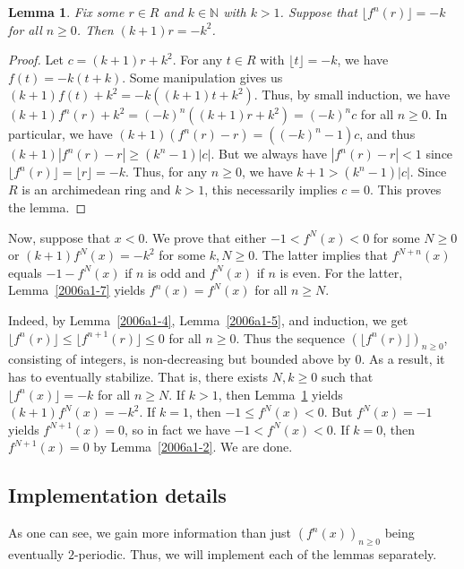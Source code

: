 \documentclass{article}
\newcommand{\N}{\mathbb{N}}
\newtheorem{lemma}{Lemma}
\begin{document}
\begin{lemma}\label{2006a1-8}
Fix some $r \in R$ and $k \in \N$ with $k > 1$.
Suppose that $\lfloor f^n(r) \rfloor = -k$ for all $n \geq 0$.
Then $(k + 1)r = -k^2$.
\end{lemma}
\begin{proof}
Let $c = (k + 1)r + k^2$.
For any $t \in R$ with $\lfloor t \rfloor = -k$, we have $f(t) = -k(t + k)$.
Some manipulation gives us $(k + 1)f(t) + k^2 = -k((k + 1)t + k^2)$.
Thus, by small induction, we have $(k + 1) f^n(r) + k^2 = (-k)^n ((k + 1) r + k^2) = (-k)^n c$ for all $n \geq 0$.
In particular, we have $(k + 1) (f^n(r) - r) = ((-k)^n - 1) c$, and thus $(k + 1) |f^n(r) - r| \geq (k^n - 1) |c|$.
But we always have $|f^n(r) - r| < 1$ since $\lfloor f^n(r) \rfloor = \lfloor r \rfloor = -k$.
Thus, for any $n \geq 0$, we have $k + 1 > (k^n - 1) |c|$.
Since $R$ is an archimedean ring and $k > 1$, this necessarily implies $c = 0$.
This proves the lemma.
\end{proof}

Now, suppose that $x < 0$.
We prove that either $-1 < f^N(x) < 0$ for some $N \geq 0$ or $(k + 1) f^N(x) = -k^2$ for some $k, N \geq 0$.
The latter implies that $f^{N + n}(x)$ equals $-1 - f^N(x)$ if $n$ is odd and $f^N(x)$ if $n$ is even.
For the latter, Lemma~\ref{2006a1-7} yields $f^n(x) = f^N(x)$ for all $n \geq N$.

Indeed, by Lemma~\ref{2006a1-4}, Lemma~\ref{2006a1-5}, and induction, we get $\lfloor f^n(r) \rfloor \leq \lfloor f^{n + 1}(r) \rfloor \leq 0$ for all $n \geq 0$.
Thus the sequence $(\lfloor f^n(r) \rfloor)_{n \geq 0}$, consisting of integers, is non-decreasing but bounded above by $0$.
As a result, it has to eventually stabilize.
That is, there exists $N, k \geq 0$ such that $\lfloor f^n(x) \rfloor = -k$ for all $n \geq N$.
If $k > 1$, then Lemma~\ref{2006a1-8} yields $(k + 1) f^N(x) = -k^2$.
If $k = 1$, then $-1 \leq f^N(x) < 0$.
But $f^N(x) = -1$ yields $f^{N + 1}(x) = 0$, so in fact we have $-1 < f^N(x) < 0$.
If $k = 0$, then $f^{N + 1}(x) = 0$ by Lemma~\ref{2006a1-2}.
We are done.



\subsection*{Implementation details}

As one can see, we gain more information than just $(f^n(x))_{n \geq 0}$ being eventually $2$-periodic.
Thus, we will implement each of the lemmas separately.
\end{document}

